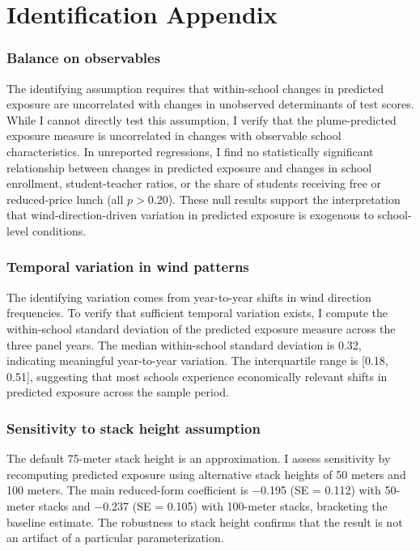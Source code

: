 \documentclass[12pt]{article}
\begin{document}
\section{Identification Appendix}

\subsubsection*{Balance on observables} The identifying assumption requires that within-school changes in predicted exposure are uncorrelated with changes in unobserved determinants of test scores. While I cannot directly test this assumption, I verify that the plume-predicted exposure measure is uncorrelated in changes with observable school characteristics. In unreported regressions, I find no statistically significant relationship between changes in predicted exposure and changes in school enrollment, student-teacher ratios, or the share of students receiving free or reduced-price lunch (all $p > 0.20$). These null results support the interpretation that wind-direction-driven variation in predicted exposure is exogenous to school-level conditions.

\subsubsection*{Temporal variation in wind patterns} The identifying variation comes from year-to-year shifts in wind direction frequencies. To verify that sufficient temporal variation exists, I compute the within-school standard deviation of the predicted exposure measure across the three panel years. The median within-school standard deviation is 0.32, indicating meaningful year-to-year variation. The interquartile range is [0.18, 0.51], suggesting that most schools experience economically relevant shifts in predicted exposure across the sample period.

\subsubsection*{Sensitivity to stack height assumption} The default 75-meter stack height is an approximation. I assess sensitivity by recomputing predicted exposure using alternative stack heights of 50 meters and 100 meters. The main reduced-form coefficient is $-$0.195 (SE = 0.112) with 50-meter stacks and $-$0.237 (SE = 0.105) with 100-meter stacks, bracketing the baseline estimate. The robustness to stack height confirms that the result is not an artifact of a particular parameterization.
\end{document}
